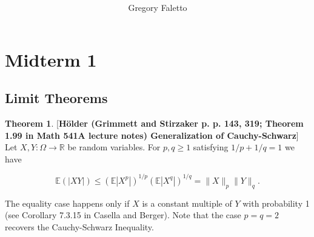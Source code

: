 \documentclass{article}
\title{
    \vspace{2in}
    \textmd{\textbf{ \hmwkTitle}}\\
}
\author{Gregory Faletto}
\date{}
\newcommand{\E}{\mathbb{E}}
\theoremstyle{definition}
\newtheorem{theorem}{Theorem}
\theoremstyle{definition}
\newtheorem{proposition}[theorem]{Proposition}
\theoremstyle{definition}
\theoremstyle{definition}
\theoremstyle{definition}
\newtheorem{definition}{Definition}[section]
\theoremstyle{definition}
\theoremstyle{definition}
\begin{document}
\maketitle

\pagebreak

\tableofcontents

%
%



\newpage

\section{Midterm 1}



%
%
%
%

\subsection{Limit Theorems}

\begin{theorem}\label{asym.thm.holder.ineq}[\textbf{H\"{o}lder (Grimmett and Stirzaker p. p. 143, 319; Theorem 1.99 in Math 541A lecture notes) Generalization of Cauchy-Schwarz}] Let \(X, Y : \Omega \to \mathbb{R}\) be random variables. For \(p, q \geq 1\) satisfying \(1/p + 1/q =1\) we have

\[
\E(|XY|) \leq (\E|X^p|)^{1/p}(\E|X^q|)^{1/q} = \lVert X \rVert_p \lVert Y \rVert_q.
\]

The equality case happens only if \(X\) is a constant multiple of \(Y\) with probability 1 (see Corollary 7.3.15 in Casella and Berger). Note that the case \(p=q=2\) recovers the Cauchy-Schwarz Inequality.
\end{theorem}
\end{document}
